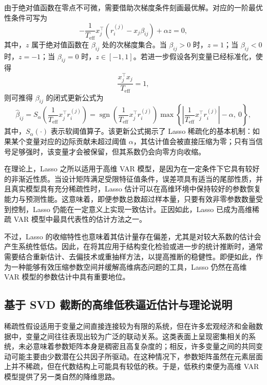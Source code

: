 \documentclass[UTF8,a4paper,12pt]{ctexbook}
\begin{document}
由于绝对值函数在零点不可微，需要借助次梯度条件刻画最优解。对应的一阶最优性条件可写为
\begin{equation}
 -\frac{1}{T_{\mathrm{eff}}}x_j^{\top}(r_i^{(j)}-x_j\beta_{ij})+\alpha z=0,
\end{equation}
其中，$z$ 属于绝对值函数在 $\beta_{ij}$ 处的次梯度集合。当 $\beta_{ij}>0$ 时，$z=1$；当 $\beta_{ij}<0$ 时，$z=-1$；当 $\beta_{ij}=0$ 时，$z\in[-1,1]$。若进一步假设各列变量已经标准化，使得
\begin{equation}
 \frac{x_j^{\top}x_j}{T_{\mathrm{eff}}}=1,
\end{equation}
则可推得 $\beta_{ij}$ 的闭式更新公式为
\begin{equation}
 \hat{\beta}_{ij}=S_{\alpha}\left(\frac{1}{T_{\mathrm{eff}}}x_j^{\top}r_i^{(j)}\right)
 =\operatorname{sgn}\left(\frac{1}{T_{\mathrm{eff}}}x_j^{\top}r_i^{(j)}\right)
 \max\left\{
 \left|\frac{1}{T_{\mathrm{eff}}}x_j^{\top}r_i^{(j)}\right|-\alpha,\ 0
 \right\},
\end{equation}
其中，$S_{\alpha}(\cdot)$ 表示软阈值算子。该更新公式揭示了 Lasso 稀疏化的基本机制：如果某个变量对应的边际贡献未超过阈值 $\alpha$，其估计值会被直接压缩为零；只有当信号足够强时，该变量才会被保留，但其系数仍会向零方向收缩。

在理论上，Lasso 之所以适用于高维 VAR 模型，是因为在一定条件下它具有较好的非渐近性质。当设计矩阵满足受限特征值条件，误差项具有适当的尾部性质，并且真实模型具有充分稀疏性时，Lasso 估计可以在高维环境中保持较好的参数恢复能力与预测性能。这意味着，即便参数总数超过样本量，只要有效非零参数数量受到控制，Lasso 仍能在一定意义上实现一致估计。正因如此，Lasso 已成为高维稀疏 VAR 模型中最具代表性的估计方法之一。

不过，Lasso 的收缩特性也意味着其估计量存在偏差，尤其是对较大系数的估计会产生系统性低估。因此，在将其应用于结构变化检验或进一步的统计推断时，通常需要结合重新估计、去偏技术或重抽样方法，以提高推断的稳健性。即便如此，作为一种能够有效压缩参数空间并缓解高维病态问题的工具，Lasso 仍然在高维 VAR 模型的参数估计中具有重要地位。

\subsection{基于 SVD 截断的高维低秩逼近估计与理论说明}

稀疏性假设适用于变量之间直接连接较为有限的系统，但在许多宏观经济和金融数据中，变量之间往往表现出较为广泛的联动关系。这类表面上呈现密集相关的系统，未必意味着参数矩阵本身是稠密且高复杂度的；相反，许多变量之间的共同变动可能主要由少数潜在公共因子所驱动。在这种情况下，参数矩阵虽然在元素层面上并不稀疏，但在代数结构上可能具有较低的秩。于是，低秩约束便为高维 VAR 模型提供了另一类自然的降维思路。
\end{document}
